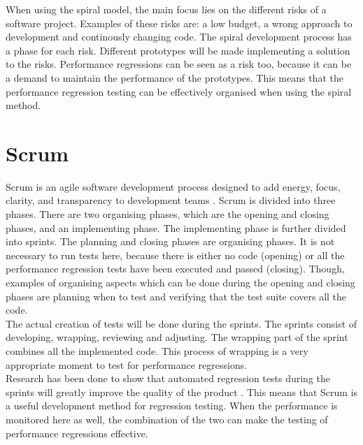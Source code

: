 When using the spiral model, the main focus lies on the different risks of a software project. Examples of these risks are: a low budget, a wrong approach to development and continously changing code. The spiral development process has a phase for each risk. Different prototypes will be made implementing a solution to the risks. Performance regressions can be seen as a risk too, because it can be a demand to maintain the performance of the prototypes. This means that the performance regression testing can be effectively organised when using the spiral method.

\section{Scrum}
Scrum is an agile software development process designed to add energy, focus, clarity, and transparency to development teams \cite{sutherland2007distributed}. Scrum is divided into three phases. There are two organising phases, which are the opening and closing phases, and an implementing phase. The implementing phase is further divided into sprints. The planning and closing phases are organising phases. It is not necessary to run tests here, because there is either no code (opening) or all the performance regression tests have been executed and passed (closing). Though, examples of organising aspects which can be done during the opening and closing phases are planning when to test and verifying that the test suite covers all the code. \\ The actual creation of tests will be done during the sprints. The sprints consist of developing, wrapping, reviewing and adjusting. The wrapping part of the sprint combines all the implemented code. This process of wrapping is a very appropriate moment to test for performance regressions. \\ Research has been done to show that automated regression tests during the sprints will greatly improve the quality of the product \cite{Future_of_Scrum}. This means that Scrum is a useful development method for regression testing. When the performance is monitored here as well, the combination of the two can make the testing of performance regressions effective.  \\

